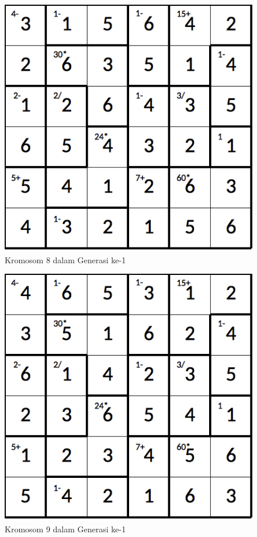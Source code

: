 \begin{figure}
\centering
\captionsetup{justification=centering}
\includegraphics[scale=0.333]{Gambar/hybridgenetic/Generation1Chromosome8}
\caption[Kromosom 8 dalam Generasi ke-1]{Kromosom 8 dalam Generasi ke-1}
\label{fig:analisisg1k8}
\end{figure}

\begin{figure}
\centering
\captionsetup{justification=centering}
\includegraphics[scale=0.333]{Gambar/hybridgenetic/Generation1Chromosome9}
\caption[Kromosom 9 dalam Generasi ke-1]{Kromosom 9 dalam Generasi ke-1}
\label{fig:analisisg1k9}
\end{figure}

